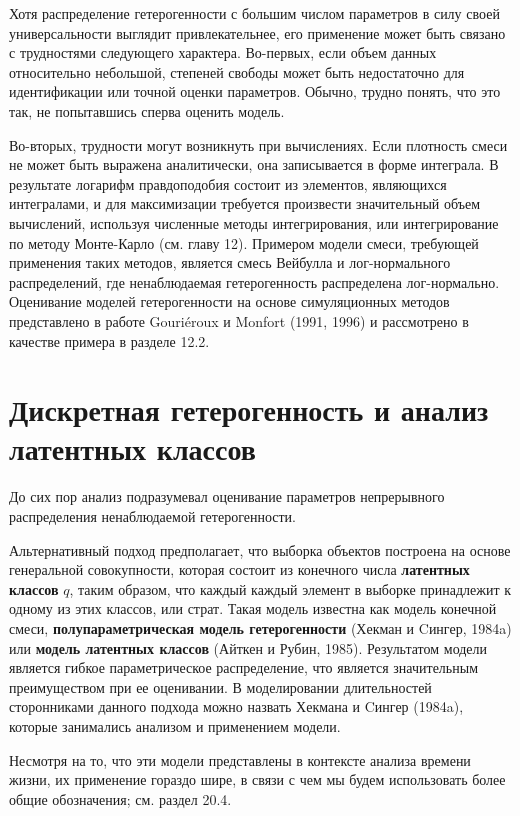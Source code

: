 Хотя распределение гетерогенности с большим числом параметров в силу своей универсальности выглядит привлекательнее, его применение может быть связано с трудностями следующего характера. Во-первых, если объем данных относительно небольшой, степеней свободы может быть недостаточно для идентификации или точной оценки параметров. Обычно, трудно понять, что это так, не попытавшись сперва оценить модель.

Во-вторых, трудности могут возникнуть при вычислениях. Если плотность смеси не может быть выражена аналитически, она записывается в форме интеграла. В результате логарифм правдоподобия состоит из элементов, являющихся интегралами, и для максимизации требуется произвести значительный объем вычислений, используя численные методы интегрирования, или интегрирование по методу Монте-Карло (см. главу 12). %
Примером модели смеси, требующей применения таких методов, является смесь Вейбулла и лог-нормального распределений, где ненаблюдаемая гетерогенность распределена лог-нормально. Оценивание моделей гетерогенности на основе симуляционных методов представлено в работе Gouri\'eroux и Monfort (1991, 1996) и рассмотрено в качестве примера в разделе 12.2. %




\section{Дискретная гетерогенность и анализ латентных классов}\label{sec:18.5}

\noindent
До сих пор анализ подразумевал оценивание параметров непрерывного распределения ненаблюдаемой гетерогенности.

Альтернативный подход предполагает, что выборка объектов построена на основе генеральной совокупности, которая состоит из конечного числа \textbf{латентных классов} $q$, таким образом, что каждый каждый элемент в выборке принадлежит к одному из этих классов, или страт. Такая модель известна как модель конечной смеси, \textbf{полупараметрическая модель гетерогенности} (Хекман и Cингер, 1984a) или \textbf{модель латентных классов} (Айткен и Рубин, 1985). Результатом модели является гибкое параметрическое распределение, что является значительным преимуществом при ее оценивании. В моделировании длительностей сторонниками данного подхода можно назвать Хекмана и Cингер (1984a), которые занимались анализом и применением модели.

Несмотря на то, что эти модели представлены в контексте анализа времени жизни, их применение гораздо шире, в связи с чем мы будем использовать более общие обозначения; см. раздел 20.4. %


